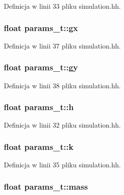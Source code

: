 Definicja w linii 33 pliku simulation.\-hh.

\hypertarget{structparams__t_a9f3f70c0cdedcb053c9d45c2e41e67b6}{
\subsubsection[{gx}]{\setlength{\rightskip}{0pt plus 5cm}float params\-\_\-t\-::gx}}\label{structparams__t_a9f3f70c0cdedcb053c9d45c2e41e67b6}


Definicja w linii 37 pliku simulation.\-hh.

\hypertarget{structparams__t_a0da484b4cc6a542875aa7b92e200f507}{
\subsubsection[{gy}]{\setlength{\rightskip}{0pt plus 5cm}float params\-\_\-t\-::gy}}\label{structparams__t_a0da484b4cc6a542875aa7b92e200f507}


Definicja w linii 38 pliku simulation.\-hh.

\hypertarget{structparams__t_a27d76064f2ae0cb93a0956027cfcc19b}{
\subsubsection[{h}]{\setlength{\rightskip}{0pt plus 5cm}float params\-\_\-t\-::h}}\label{structparams__t_a27d76064f2ae0cb93a0956027cfcc19b}


Definicja w linii 32 pliku simulation.\-hh.

\hypertarget{structparams__t_a97ee2783cf89cee1151be3250e9054b3}{
\subsubsection[{k}]{\setlength{\rightskip}{0pt plus 5cm}float params\-\_\-t\-::k}}\label{structparams__t_a97ee2783cf89cee1151be3250e9054b3}


Definicja w linii 35 pliku simulation.\-hh.

\hypertarget{structparams__t_afe4a59fe43565a71a0a7a155714e2af1}{
\subsubsection[{mass}]{\setlength{\rightskip}{0pt plus 5cm}float params\-\_\-t\-::mass}}\label{structparams__t_afe4a59fe43565a71a0a7a155714e2af1}


